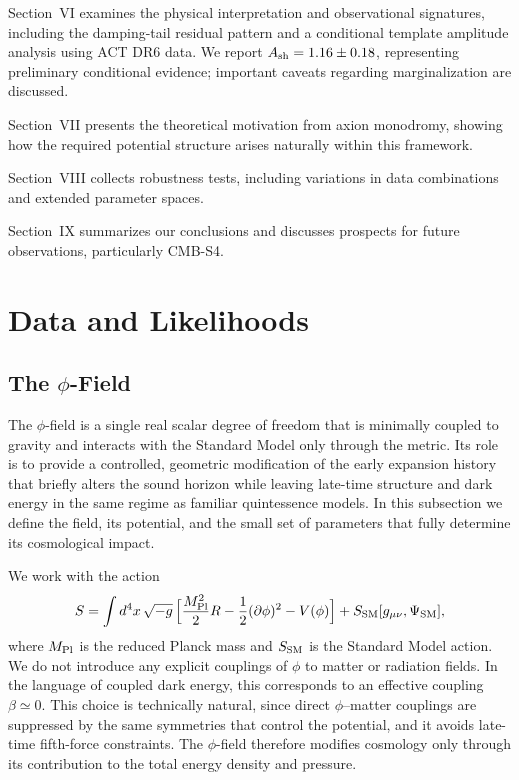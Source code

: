 \documentclass[a4paper,11pt]{article}
\begin{document}
Section~VI examines the physical interpretation and observational signatures, including the damping-tail residual pattern and a conditional template amplitude analysis using ACT DR6 data. We report $A_{\rm sh} = 1.16 \pm 0.18$, representing preliminary conditional evidence; important caveats regarding marginalization are discussed.

Section~VII presents the theoretical motivation from axion monodromy, showing how the required potential structure arises naturally within this framework.

Section~VIII collects robustness tests, including variations in data combinations and extended parameter spaces.

Section~IX summarizes our conclusions and discusses prospects for future observations, particularly CMB-S4.


\section{Data and Likelihoods}


\subsection{The $\phi$-Field}
\label{sec:phi_field}

The $\phi$-field is a single real scalar degree of freedom that is minimally coupled to gravity and interacts with the Standard Model only through the metric. Its role is to provide a controlled, geometric modification of the early expansion history that briefly alters the sound horizon while leaving late-time structure and dark energy in the same regime as familiar quintessence models. In this subsection we define the field, its potential, and the small set of parameters that fully determine its cosmological impact.

We work with the action
\begin{equation}
S = \int d^4x\,\sqrt{-g}\,\Big[ \frac{M_{\rm Pl}^2}{2} R - \frac{1}{2} (\partial\phi)^2 - V(\phi) \Big] + S_{\rm SM}[g_{\mu\nu},\Psi_{\rm SM}] ,
\end{equation}
where $M_{\rm Pl}$ is the reduced Planck mass and $S_{\rm SM}$ is the Standard Model action. We do not introduce any explicit couplings of $\phi$ to matter or radiation fields. In the language of coupled dark energy, this corresponds to an effective coupling $\beta \simeq 0$. This choice is technically natural, since direct $\phi$--matter couplings are suppressed by the same symmetries that control the potential, and it avoids late-time fifth-force constraints. The $\phi$-field therefore modifies cosmology only through its contribution to the total energy density and pressure.
\end{document}
